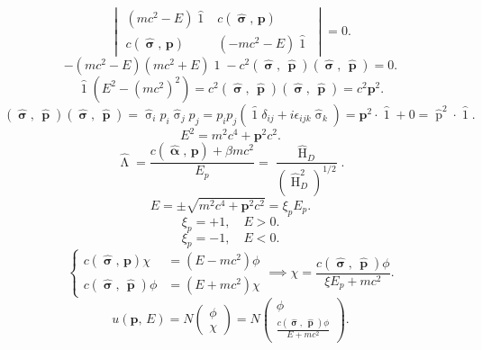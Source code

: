 \documentclass[a4paper]{article}
\begin{document}
\[
	\begin{vmatrix} (mc^2-E)\widehat{\operatorname{1}}&
	c \left( \widehat{\operatorname{\boldsymbol{\sigma}}},\,
\mathbf{p}\right) \\
c\left( \widehat{\operatorname{\boldsymbol{\sigma}}},\,
\mathbf{p}\right) & (-mc^2-E) \widehat{\operatorname{1}}\end{vmatrix} =0
.\]
\[
	-(mc^2-E) (mc^2+E) \widehat{\operatorname{1}}- c^2
	\left( \widehat{\operatorname{\boldsymbol{\sigma}}},\,\widehat{\operatorname{\mathbf{p}}} \right) \left( \widehat{\operatorname{\boldsymbol{\sigma}}},\,\widehat{\operatorname{\mathbf{p}}} \right)=0
.\] 
\[
	\widehat{\operatorname{1}}(E^2- (mc^2)^2)= c^2
\left( \widehat{\operatorname{\boldsymbol{\sigma}}},\,\widehat{\operatorname{\mathbf{p}}} \right)\left( \widehat{\operatorname{\boldsymbol{\sigma}}},\,\widehat{\operatorname{\mathbf{p}}} \right)=
c^2 \mathbf{p}^2
.\] 
\[
\left( \widehat{\operatorname{\boldsymbol{\sigma}}},\,\widehat{\operatorname{\mathbf{p}}} \right)\left( \widehat{\operatorname{\boldsymbol{\sigma}}},\,\widehat{\operatorname{\mathbf{p}}} \right)=
\widehat{\operatorname{\sigma}}_i p_i \widehat{\operatorname{\sigma}}_j p_j= p_i p_j \left( \widehat{\operatorname{1}}\delta_{ij}+
i \epsilon_{ijk}\widehat{\operatorname{\sigma}}_k\right) =
\mathbf{p}^2 \cdot \widehat{\operatorname{1}}+0=
\widehat{\operatorname{p}}^2\cdot \widehat{\operatorname{1}}
.\] 
\[
	E^2 =m^2 c^4 + \mathbf{p}^2 c^2
.\] 
\[
	\widehat{\operatorname{\Lambda}}= \frac{c\left( \widehat{\operatorname{\boldsymbol{\alpha}}},\,\mathbf{p} \right) +\beta mc^2}{E_p}=\frac{\widehat{\operatorname{H}}_D}{\left( \widehat{\operatorname{H}}_D^2 \right) ^{1 /2}}
.\] 
\[
	E= \pm \sqrt{ m^2 c^4 +\mathbf{p}^2 c^2} = \xi_p E_p
.\] 
\[
\xi_p=+1,\quad E>0
.\] 
\[
	\xi_p=-1,\quad E<0
.\] 
\[
\left\{
\begin{aligned}
	c \left( \widehat{\operatorname{\boldsymbol{\sigma}}},\,
	\mathbf{p}\right) \chi&=  (E-mc^2)\phi \\
	c \left( \widehat{\operatorname{\boldsymbol{\sigma}}},\,
\widehat{\operatorname{\mathbf{p}}}\right)\phi&=
	(E+mc^2)\chi
\end{aligned} 
\right.\implies
\chi= \frac{c\left( \widehat{\operatorname{\boldsymbol{\sigma}}},\,
\widehat{\operatorname{\mathbf{p}}}\right) \phi}{\xi E_p+mc^2}
.\] 
\[
	u\left( \mathbf{p},\,E \right) = N \begin{pmatrix} \phi\\
	\chi\end{pmatrix} =N \begin{pmatrix} 
\phi \\ \frac{c \left( \widehat{\operatorname{\boldsymbol{\sigma}}},\,
\widehat{\operatorname{\mathbf{p}}}\right) \phi}{E+mc^2}\end{pmatrix} 
.\] 
\end{document}
